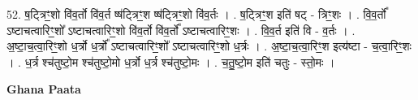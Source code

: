 \documentclass[17pt]{extarticle}
\begin{document}
52. ष॒ट्त्रिꣳ॒॒शो वि॑व॒र्तो वि॑व॒र्त ष्ष॑ट्त्रिꣳ॒॒श ष्ष॑ट्त्रिꣳ॒॒शो वि॑व॒र्तः । . ष॒ट्त्रिꣳ॒॒श इति॑ षट् - त्रिꣳ॒॒शः । . वि॒व॒र्तो᳚ ऽष्टाचत्वारिꣳ॒॒शो᳚ ऽष्टाचत्वारिꣳ॒॒शो वि॑व॒र्तो वि॑व॒र्तो᳚ ऽष्टाचत्वारिꣳ॒॒शः । . वि॒व॒र्त इति॑ वि - व॒र्तः । . अ॒ष्टा॒च॒त्वा॒रिꣳ॒॒शो ध॒र्त्रो ध॒र्त्रो᳚ ऽष्टाचत्वारिꣳ॒॒शो᳚ ऽष्टाचत्वारिꣳ॒॒शो ध॒र्त्रः । . अ॒ष्टा॒च॒त्वा॒रिꣳ॒॒श इत्य॑ष्टा - च॒त्वा॒रिꣳ॒॒शः । . ध॒र्त्र श्च॑तुष्टो॒म श्च॑तुष्टो॒मो ध॒र्त्रो ध॒र्त्र श्च॑तुष्टो॒मः । . च॒तु॒ष्टो॒म इति॑ चतुः - स्तो॒मः । \newline

\textbf{Ghana Paata } \newline
\end{document}
